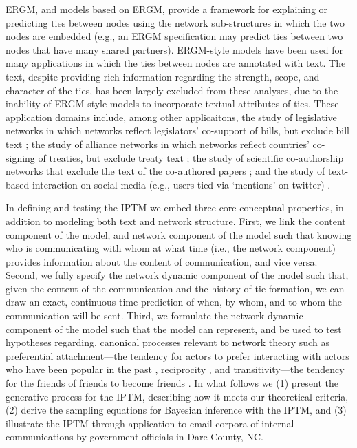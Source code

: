 \documentclass[twoside]{article}
\begin{document}
ERGM, and models based on ERGM, provide a framework for explaining or predicting ties between nodes using the network sub-structures in which the two nodes are embedded (e.g., an ERGM specification may predict ties between two nodes that have many shared partners). ERGM-style models have been used for many applications in which the ties between nodes are annotated with text. The text, despite providing rich information regarding the strength, scope, and character of the ties, has been largely excluded from these analyses, due to the inability of ERGM-style models to incorporate textual attributes of ties. These application domains include, among other applicaitons, the study of legislative networks in which networks reflect legislators' co-support of bills, but exclude bill text \citep{bratton2011networks,aleman2013explaining}; the study of alliance networks in which networks reflect countries' co-signing of treaties, but exclude treaty text \citep{camber2010geometry,cranmer2012complex,cranmer2012toward,kinne2016agreeing}; the study of scientific co-authorship networks that exclude the text of the co-authored papers \citep{kronegger2011collaboration,liang2015changing,fahmy2016gender}; and the study of text-based interaction on social media (e.g., users tied via `mentions' on twitter) \citep{yoon2014strategies,peng2016follower,lai2017connecting}.

In defining and testing the IPTM we embed three core conceptual properties, in addition to modeling both text and network structure. First, we link the content component of the model, and network component of the model such that knowing who is communicating with whom at what time (i.e., the network component) provides information about the content of communication,  and vice versa. Second, we fully specify the network dynamic component of the model such that, given the content of the communication and the history of tie formation, we can draw an exact, continuous-time prediction of when, by whom, and to whom the communication will be sent. Third, we formulate the network dynamic component of the model such that the model can represent, and be used to test hypotheses regarding, canonical processes relevant to network theory such as preferential attachment---the tendency for actors to prefer interacting with actors who have been popular in the past \citep{barabasi1999emergence,vazquez2003growing,jeong2003measuring}, reciprocity \citep{hammer1985implications,rao1987measures}, and transitivity---the tendency for the friends of friends to become friends \citep{louch2000personal,burda2004network}. In what follows we (1) present the generative process for the IPTM, describing how it meets our theoretical criteria, (2) derive the sampling equations for Bayesian inference with the IPTM, and (3) illustrate the IPTM through application to email corpora of internal communications by government officials in Dare County, NC.
\end{document}
